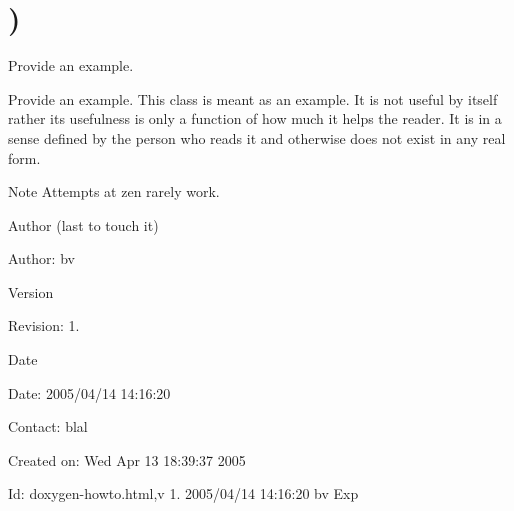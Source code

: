 \hypertarget{group__somewhere}{\section{)}
\label{group__somewhere}
}


\-Provide an example.  


\-Provide an example. \-This class is meant as an example. \-It is not useful by itself rather its usefulness is only a function of how much it helps the reader. \-It is in a sense defined by the person who reads it and otherwise does not exist in any real form.

\begin{DoxyNote}{\-Note}
\-Attempts at zen rarely work.
\end{DoxyNote}
\begin{DoxyAuthor}{\-Author}
(last to touch it) 
\end{DoxyAuthor}
\begin{DoxyParagraph}{\-Author\-:}
bv 
\end{DoxyParagraph}


\begin{DoxyVersion}{\-Version}

\end{DoxyVersion}
\begin{DoxyParagraph}{\-Revision\-:}
1. 
\end{DoxyParagraph}


\begin{DoxyDate}{\-Date}

\end{DoxyDate}
\begin{DoxyParagraph}{\-Date\-:}
2005/04/14 14\-:16\-:20 
\end{DoxyParagraph}


\-Contact\-: blal

\-Created on\-: \-Wed \-Apr 13 18\-:39\-:37 2005

\begin{DoxyParagraph}{\-Id\-:}
doxygen-\/howto.\-html,v 1. 2005/04/14 14\-:16\-:20 bv \-Exp 
\end{DoxyParagraph}
